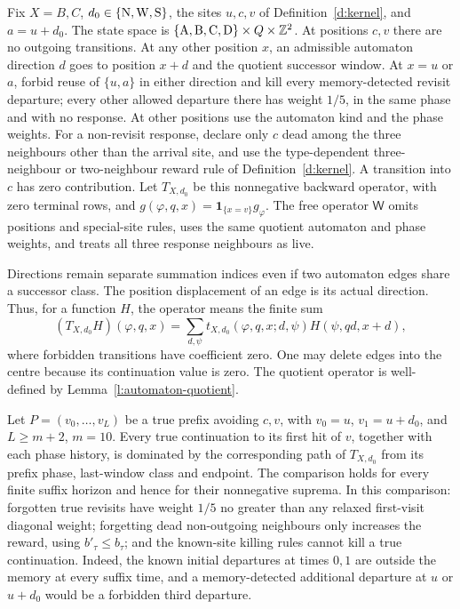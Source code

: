 \begin{definition}\label{d:stationary-walk}
Fix \(X=B,C\), \(d_0\in\{{\rm N},{\rm W},{\rm S}\}\),
the sites \(u,c,v\) of Definition~\ref{d:kernel}, and \(a=u+d_0\).
The state space is
\(\{{\rm A},{\rm B},{\rm C},{\rm D}\}\times Q\times\mathbb Z^2\).
At positions \(c,v\) there are no outgoing transitions.
At any other position \(x\), an admissible automaton direction \(d\)
goes to position \(x+d\) and the quotient successor window.
At \(x=u\) or \(a\), forbid reuse of \(\{u,a\}\) in either
direction and kill every memory-detected revisit departure;
every other allowed departure there has weight \(1/5\),
in the same phase and with no response.
At other positions use the automaton kind and the phase weights.
For a non-revisit response, declare only \(c\) dead among the three
neighbours other than the arrival site, and use the type-dependent
three-neighbour or two-neighbour reward rule of Definition~\ref{d:kernel}.
A transition into \(c\) has zero contribution.
Let \(T_{X,d_0}\) be this nonnegative backward operator, with zero
terminal rows, and \(g(\varphi,q,x)=\mathbf1_{\{x=v\}}g_\varphi\).
The free operator \(\mathsf W\) omits positions and special-site
rules, uses the same quotient automaton and phase weights, and
treats all three response neighbours as live.
\end{definition}

Directions remain separate summation indices even if two automaton
edges share a successor class. The position displacement of an edge
is its actual direction. Thus, for a function \(H\), the operator
means the finite sum
\[
 (T_{X,d_0}H)(\varphi,q,x)
   =\sum_{d,\psi}t_{X,d_0}(\varphi,q,x;d,\psi)
                         H(\psi,q d,x+d),
\]
where forbidden transitions have coefficient zero. One may delete
edges into the centre because its continuation value is zero.
The quotient operator is well-defined by
Lemma~\ref{l:automaton-quotient}.

\begin{lemma}\label{l:stationary-domination}
Let \(P=(v_0,\ldots,v_L)\) be a true prefix avoiding \(c,v\),
with \(v_0=u\), \(v_1=u+d_0\), and \(L\ge m+2\), \(m=10\).
Every true continuation to its first hit of \(v\), together with
each phase history, is dominated by the corresponding path of
\(T_{X,d_0}\) from its prefix phase, last-window class and endpoint.
The comparison holds for every finite suffix horizon and hence
for their nonnegative suprema.
In this comparison:
forgotten true revisits have weight \(1/5\) no greater than any
relaxed first-visit diagonal weight; forgetting dead non-outgoing
neighbours only increases the reward, using \(b'_\tau\le b_\tau\);
and the known-site killing rules cannot kill a true continuation.
Indeed, the known initial departures at times \(0,1\) are outside
the memory at every suffix time, and a memory-detected additional
departure at \(u\) or \(u+d_0\) would be a forbidden third departure.
\end{lemma}

